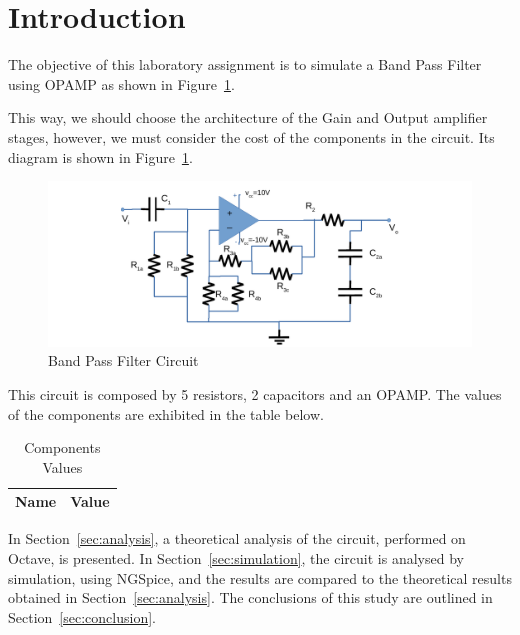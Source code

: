 \section{Introduction}
\label{sec:introduction}
The objective of this laboratory assignment is to simulate a Band Pass Filter using OPAMP as shown in Figure~\ref{fig:circuit}. 

This way, we should choose the architecture of the Gain and Output amplifier stages, however, we must consider the cost of the components in the circuit. Its diagram is shown in Figure~\ref{fig:circuit}.
\begin{figure}[H] \centering
\includegraphics[width=0.8\linewidth]{circuit.pdf}
\caption{Band Pass Filter Circuit}                                     
\label{fig:circuit}
\end{figure}
This circuit is composed by 5 resistors, 2 capacitors and an OPAMP.
The values of the components are exhibited in the table below.
\begin{table}[H]
  \centering
  \begin{tabular}{|l|r|}
     \hline    
    {\bf Name} & {\bf Value} \\ \hline   
    
  \end{tabular}
  \caption{Components Values}
  \label{tab:datags}
\end{table}

In Section~\ref{sec:analysis}, a theoretical analysis of the circuit, 
performed on Octave, is presented. In Section~\ref{sec:simulation}, the 
circuit is analysed by simulation, using NGSpice, and the results are compared to 
the theoretical results obtained in Section~\ref{sec:analysis}. The conclusions 
of this study are outlined in Section~\ref{sec:conclusion}.

